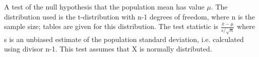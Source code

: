  A test of the null hypothesis that the population mean has value $ \mu . $
The distribution used is the t-distribution with n-1 degrees of freedom,
where n is the sample size; tables are given for this distribution.
The test statistic is $ \frac{ \bar{x} - \mu }{ s / \sqrt{n}} $ where
s is an unbiased estimate of the population standard deviation,
i.e. calculated using divisor n-1. This test assumes that X is normally
distributed.
